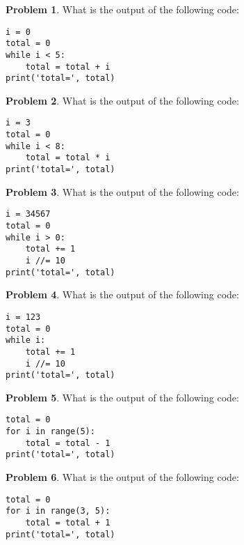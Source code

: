 \documentclass[10pt]{article}
\theoremstyle{definition}
\newtheorem{problem}{Problem}
\begin{document}
\begin{problem}
    What is the output of the following code:
\end{problem}
\begin{lstlisting}
i = 0
total = 0
while i < 5:
    total = total + i
print('total=', total)
\end{lstlisting}
\vspace{1.8in}


\begin{problem}
    What is the output of the following code:
\end{problem}
\begin{lstlisting}
i = 3
total = 0
while i < 8:
    total = total * i
print('total=', total)
\end{lstlisting}
\vspace{1.8in}


\begin{problem}
    What is the output of the following code:
\end{problem}
\begin{lstlisting}
i = 34567
total = 0
while i > 0:
    total += 1
    i //= 10
print('total=', total)
\end{lstlisting}
\vspace{1.8in}


\begin{problem}
    What is the output of the following code:
\end{problem}
\begin{lstlisting}
i = 123
total = 0
while i:
    total += 1
    i //= 10
print('total=', total)
\end{lstlisting}
\vspace{1.8in}


\begin{problem}
    What is the output of the following code:
\end{problem}
\begin{lstlisting}
total = 0
for i in range(5):
    total = total - 1
print('total=', total)
\end{lstlisting}
\vspace{2in}

\begin{problem}
    What is the output of the following code:
\end{problem}
\begin{lstlisting}
total = 0
for i in range(3, 5):
    total = total + 1
print('total=', total)
\end{lstlisting}
\vspace{2in}
\end{document}
